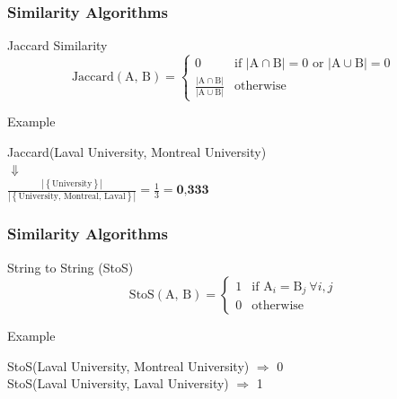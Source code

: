 \documentclass{beamer}
\begin{document}
	\begin{frame}\frametitle{Similarity Algorithms}
		\begin{block}{Jaccard Similarity}	
			\begin{equation*}
			\text{Jaccard}(\text{A, B}) =
			\begin{cases}
			0 & \text{if } |\text{A} \cap \text{B}| = 0 \text{ or } |\text{A} \cup \text{B}| = 0\\
			\frac{|\text{A} \cap \text{B}|}{|\text{A} \cup \text{B}|} & \text{otherwise}
			\end{cases}
			\end{equation*}
		\end{block}
		\begin{block}{Example}	
		\begin{center}
			Jaccard(Laval University, Montreal University)
			\bigskip\\ $\Downarrow$ \\ \bigskip
			$\frac{|\left\{\text{University}\right\}|}{|\left\{\text{University, Montreal, Laval}\right\}|} = \frac{1}{3} = \textbf{0,333}$
		\end{center}
		\end{block}
	\end{frame}

	\begin{frame}\frametitle{Similarity Algorithms}
		\begin{block}{String to String (StoS)}	
			\begin{equation*}
				\text{StoS}(\text{A, B}) =
				\begin{cases}
				1 & \text{if } \text{A}_i = \text{B}_j \ \forall i, j\\
				0 & \text{otherwise}
				\end{cases}
			\end{equation*}
		\end{block}
		\begin{block}{Example}	
			\begin{center}
				StoS(Laval University, Montreal University) $\Rightarrow$  0 \\
				StoS(Laval University, Laval University) $\Rightarrow$  1
			\end{center}
		\end{block}
	\end{frame}
\end{document}
